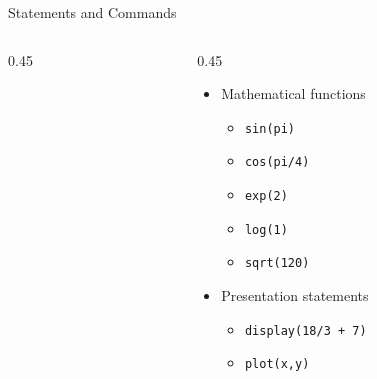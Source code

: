 {}\documentclass[letterpaper,
compress,
xcolor=x11names,
]{beamer}
\begin{document}
\begin{frame}{Statements and Commands}
\begin{columns}
\begin{column}{0.45\linewidth}
\begin{itemize}
			\end{itemize}
		\end{column}
		\begin{column}{0.45\linewidth}
			\begin{itemize}
				\item<3-> Mathematical functions 
				\begin{itemize}
					\item \texttt{sin(pi)}
					\item \texttt{cos(pi/4)}
					\item \texttt{exp(2)}
					\item \texttt{log(1)}
					\item \texttt{sqrt(120)}
				\end{itemize}
				\item<5-> Presentation statements 
				\begin{itemize}
					\item \texttt{display(18/3 + 7)}
					\item \texttt{plot(x,y)}
				\end{itemize}
			\end{itemize}
		\end{column}
	\end{columns}
\end{frame}
\end{document}
